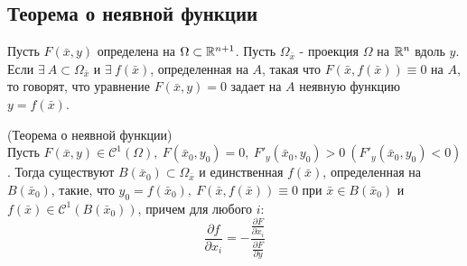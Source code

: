 \subsection{Теорема о неявной функции}
\begin{definition}%
    Пусть $F(\bar{x},y)$ определена на $\Omega\subset \mathbb{R}^{n+1}$. Пусть $\Omega_{\bar{x}}$ - проекция $\Omega$ на $\mathbb{R}^n$ вдоль $y$. Если $\exists\ A\subset \Omega_{\bar{x}}$ и $\exists\ f(\bar{x})$, определенная на $A$, такая что $F(\bar{x}, f(\bar{x}))\equiv 0$ на $A$, то говорят, что уравнение $F(\bar{x}, y)=0$ задает на $A$ неявную функцию $y=f(\bar{x})$.
\end{definition} 
\begin{theorem} (Теорема о неявной функции)\\
    Пусть $F(\bar{x},y)\in \mathcal{C}^1(\Omega),\ F(\bar{x}_0,y_0)=0,\ F'_y(\bar{x}_0,y_0)>0\ (F'_y(\bar{x}_0,y_0)<0)$. Тогда существуют $B(\bar{x}_0)\subset \Omega_{\bar{x}}$ и единственная $f(\bar{x})$, определенная на $B(\bar{x}_0)$, такие, что $y_0=f(\bar{x}_0),\ F(\bar{x},f(\bar{x}))\equiv 0$ при $\bar{x}\in B(\bar{x}_0)$ и $f(\bar{x})\in \mathcal{C}^1(B(\bar{x}_0))$, причем для любого $i$:
    \[\frac{\partial {f}}{\partial {x_i}}=-\frac{\frac{\partial {F}}{\partial {x_i}}}{\frac{\partial {F}}{\partial {y}}}\]
\end{theorem} 
